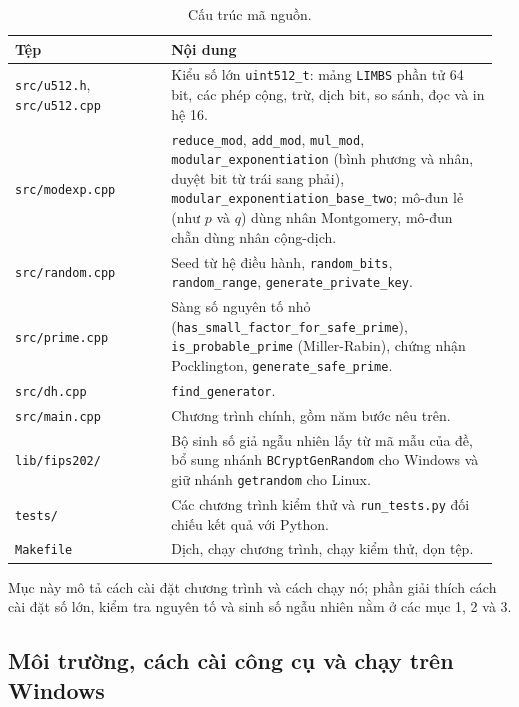 \begin{table}[h]
\centering
\begin{tabular}{@{}p{0.31\linewidth}p{0.65\linewidth}@{}}
\toprule
Tệp & Nội dung \\
\midrule
\texttt{src/u512.h}, \texttt{src/u512.cpp} &
Kiểu số lớn \texttt{uint512\_t}: mảng \texttt{LIMBS} phần tử 64 bit, các phép
cộng, trừ, dịch bit, so sánh, đọc và in hệ 16. \\
\texttt{src/modexp.cpp} &
\texttt{reduce\_mod}, \texttt{add\_mod}, \texttt{mul\_mod},
\texttt{modular\_exponentiation} (bình phương và nhân, duyệt bit từ trái sang
phải), \texttt{modular\_exponentiation\_base\_two}; mô-đun lẻ (như $p$ và $q$)
dùng nhân Montgomery, mô-đun chẵn dùng nhân cộng-dịch. \\
\texttt{src/random.cpp} &
Seed từ hệ điều hành, \texttt{random\_bits}, \texttt{random\_range},
\texttt{generate\_private\_key}. \\
\texttt{src/prime.cpp} &
Sàng số nguyên tố nhỏ (\texttt{has\_small\_factor\_for\_safe\_prime}),
\texttt{is\_probable\_prime} (Miller-Rabin), chứng nhận Pocklington,
\texttt{generate\_safe\_prime}. \\
\texttt{src/dh.cpp} & \texttt{find\_generator}. \\
\texttt{src/main.cpp} & Chương trình chính, gồm năm bước nêu trên. \\
\texttt{lib/fips202/} &
Bộ sinh số giả ngẫu nhiên lấy từ mã mẫu của đề, bổ sung nhánh
\texttt{BCryptGenRandom} cho Windows và giữ nhánh \texttt{getrandom} cho Linux. \\
\texttt{tests/} &
Các chương trình kiểm thử và \texttt{run\_tests.py} đối chiếu kết quả với Python. \\
\texttt{Makefile} & Dịch, chạy chương trình, chạy kiểm thử, dọn tệp. \\
\bottomrule
\end{tabular}
\caption{Cấu trúc mã nguồn.}
\label{tab:cautruc}
\end{table}

Mục này mô tả cách cài đặt chương trình và cách chạy nó; phần giải thích cách
cài đặt số lớn, kiểm tra nguyên tố và sinh số ngẫu nhiên nằm ở các mục 1, 2 và 3.

\subsection{Môi trường, cách cài công cụ và chạy trên Windows}

